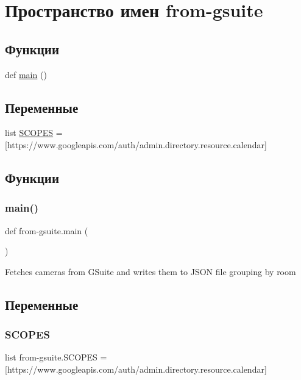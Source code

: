 \hypertarget{namespacefrom-gsuite}{}\section{Пространство имен from-\/gsuite}
\label{namespacefrom-gsuite}
\subsection*{Функции}
\begin{DoxyCompactItemize}
\item 
def \hyperlink{namespacefrom-gsuite_a431d5ae5f08baa594842e68180930f6c}{main} ()
\end{DoxyCompactItemize}
\subsection*{Переменные}
\begin{DoxyCompactItemize}
\item 
list \hyperlink{namespacefrom-gsuite_a359fb1aa3ebe4472fff6f682676e7dc0}{S\+C\+O\+P\+ES} = \mbox{[}\textquotesingle{}https\+://www.\+googleapis.\+com/auth/admin.\+directory.\+resource.\+calendar\textquotesingle{}\mbox{]}
\end{DoxyCompactItemize}


\subsection{Функции}
\mbox{\label{namespacefrom-gsuite_a431d5ae5f08baa594842e68180930f6c}} 
\subsubsection{\texorpdfstring{main()}{main()}}
{\footnotesize\ttfamily def from-\/gsuite.\+main (\begin{DoxyParamCaption}{ }\end{DoxyParamCaption})}

\begin{DoxyVerb}Fetches cameras from GSuite and writes them to JSON file grouping by room 
\end{DoxyVerb}
 

\subsection{Переменные}
\mbox{\label{namespacefrom-gsuite_a359fb1aa3ebe4472fff6f682676e7dc0}} 
\subsubsection{\texorpdfstring{S\+C\+O\+P\+ES}{SCOPES}}
{\footnotesize\ttfamily list from-\/gsuite.\+S\+C\+O\+P\+ES = \mbox{[}\textquotesingle{}https\+://www.\+googleapis.\+com/auth/admin.\+directory.\+resource.\+calendar\textquotesingle{}\mbox{]}}

